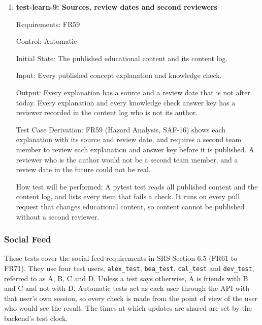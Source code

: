 \documentclass[12pt, titlepage]{article}
\begin{document}
\begin{enumerate}
\item{\textbf{test-learn-9: Sources, review dates and second reviewers}\\}

Requirements: FR59

Control: Automatic

Initial State: The published educational content and its content log.

Input: Every published concept explanation and knowledge check.

Output: Every explanation has a source and a review date that is not after
today. Every explanation and every knowledge check answer key has a reviewer
recorded in the content log who is not its author.

Test Case Derivation: FR59 (Hazard Analysis, SAF-16) shows each explanation
with its source and review date, and requires a second team member to review
each explanation and answer key before it is published. A reviewer who is the
author would not be a second team member, and a review date in the future
could not be real.

How test will be performed: A pytest test reads all published content and the
content log, and lists every item that fails a check. It runs on every pull
request that changes educational content, so content cannot be published
without a second reviewer.

\end{enumerate}

\subsubsection{Social Feed}

These tests cover the social feed requirements in SRS Section 6.5 (FR61 to
FR71). They use four test users, \texttt{alex\_test}, \texttt{bea\_test},
\texttt{cal\_test} and \texttt{dev\_test}, referred to as A, B, C and D. Unless
a test says otherwise, A is friends with B and C and not with D. Automatic
tests act as each user through the API with that user's own session, so every
check is made from the point of view of the user who would see the result.
The times at which updates are shared are set by the backend's test clock.
\end{document}
